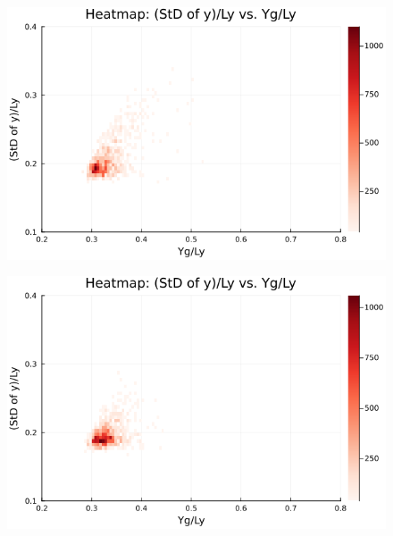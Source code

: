 \begin{figure}[H]
  \centering
  \includegraphics[scale=0.6]{image/RaRtmap10_heat/2023-12-28T12:38:51.436_map_10times_chi1.265_Ay50_rho0.4_T0.43_dT0.04_Rd0.0_Rt0.0_Ra1.877538_g0.0003999718779659611_run4.0e8.png}
  \label{}
\end{figure}

\begin{figure}[H]
  \centering
  \includegraphics[scale=0.6]{image/RaRtmap10_heat/2023-12-28T12:38:51.519_map_10times_chi1.265_Ay50_rho0.4_T0.43_dT0.04_Rd0.0_Rt0.125_Ra0.0_g0.0003999718779659611_run4.0e8.png}
  \label{}
\end{figure}


